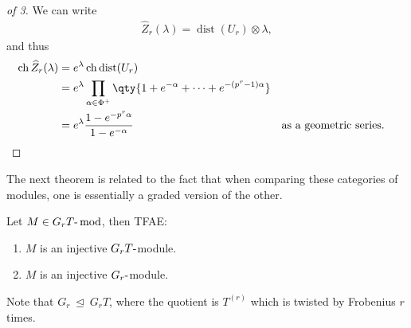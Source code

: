 \begin{proof}[of 3]

We can write
\begin{align*}  
\widehat{Z}_r(\lambda) = \operatorname{dist}(U_r) \otimes\lambda
,\end{align*}
and thus
\begin{align*}  
\operatorname{ch}\widehat{Z}_r(\lambda) 
&= e^{\lambda} \operatorname{ch}\operatorname{dist}(U_r)  \\
&= e^{\lambda} \prod_{\alpha\in \Phi^+}\qty{ 1 + e^{-\alpha} + \cdots + e^{-(p^r-1)\alpha} } \\
&= e^\lambda {1 - e^{-p^r \alpha} \over 1 - e^{-\alpha}} && \text{as a geometric series}
.\end{align*}

\end{proof}

The next theorem is related to the fact that when comparing these
categories of modules, one is essentially a graded version of the other.

\begin{theorem}[?]

Let \(M\in{{G_rT}{\hbox{-}}\operatorname{mod}}\), then TFAE:

\begin{enumerate}
\def\labelenumi{\arabic{enumi}.}
\tightlist
\item
  \(M\) is an injective \(G_r T{\hbox{-}}\)module.
\item
  \(M\) is an injective \(G_r{\hbox{-}}\)module.
\end{enumerate}

\end{theorem}

Note that \(G_r {~\trianglelefteq~}G_r T\), where the quotient is
\(T^{(r)}\) which is twisted by Frobenius \(r\) times.

